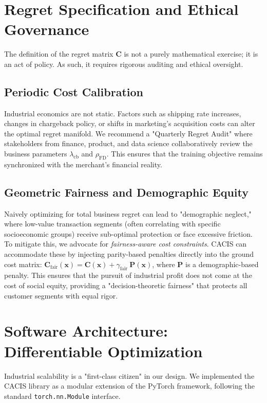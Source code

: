 \documentclass[sigconf,anonymous]{acmart}
\newcommand{\CACIS}{\textsc{CACIS}}
\newcommand{\vx}{\mathbf{x}}
\newcommand{\mC}{\mathbf{C}}
\begin{document}
\section{Regret Specification and Ethical Governance}
\label{sec:ethics}
The definition of the regret matrix $\mC$ is not a purely mathematical exercise; it is an act of policy. As such, it requires rigorous auditing and ethical oversight.

\subsection{Periodic Cost Calibration}
Industrial economics are not static. Factors such as shipping rate increases, changes in chargeback policy, or shifts in marketing's acquisition costs can alter the optimal regret manifold. We recommend a "Quarterly Regret Audit" where stakeholders from finance, product, and data science collaboratively review the business parameters $\lambda_{\mathrm{cb}}$ and $\rho_{\mathrm{FD}}$. This ensures that the training objective remains synchronized with the merchant's financial reality.

\subsection{Geometric Fairness and Demographic Equity}
Naively optimizing for total business regret can lead to "demographic neglect," where low-value transaction segments (often correlating with specific socioeconomic groups) receive sub-optimal protection or face excessive friction. To mitigate this, we advocate for \emph{fairness-aware cost constraints}. \CACIS{} can accommodate these by injecting parity-based penalties directly into the ground cost matrix: $\mC_{\text{fair}}(\vx) = \mC(\vx) + \gamma_{\text{fair }} \mathbf{P}(\vx)$, where $\mathbf{P}$ is a demographic-based penalty. This ensures that the pursuit of industrial profit does not come at the cost of social equity, providing a "decision-theoretic fairness" that protects all customer segments with equal rigor.

\section{Software Architecture: Differentiable Optimization}
\label{sec:architecture}
Industrial scalability is a "first-class citizen" in our design. We implemented the \CACIS{} library as a modular extension of the PyTorch framework, following the standard \texttt{torch.nn.Module} interface.
\end{document}
